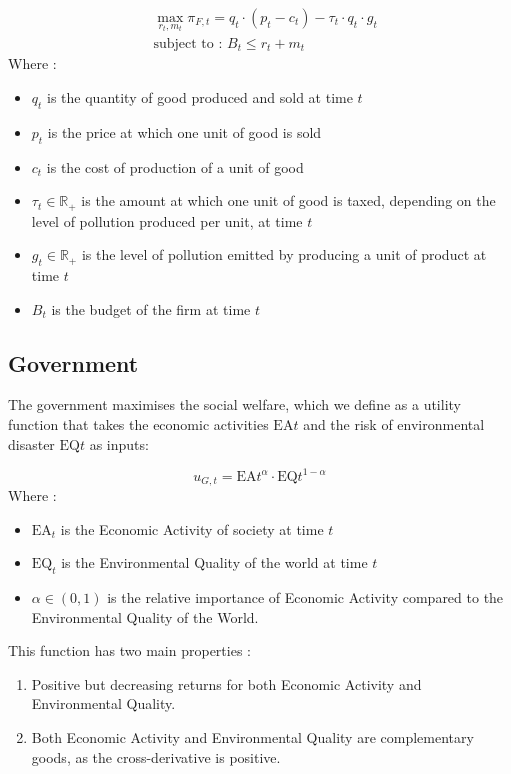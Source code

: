 \documentclass{article}
\begin{document}
\begin{equation}
    \begin{split}
        &\max_{r_{t},m_{t}}{\pi_{F,t}=q_{t}\cdot\left(p_{t}-c_{t}\right)-\tau_{t}\cdot q_{t}\cdot g_{t}} \\
        &\text{subject to : } B_{t} \leq r_{t} + m_{t}
    \end{split}
\end{equation}
Where : 
\begin{itemize}
    \item $q_{t}$ is the quantity of good produced and sold at time $t$
    \item $p_{t}$ is the price at which one unit of good is sold
    \item $c_{t}$ is the cost of production of a unit of good
    \item $\tau_{t}\in\mathbb{R}_{+}$ is the amount at which one unit of good is taxed, depending on the level of pollution produced per unit, at time $t$
    \item $g_{t}\in\mathbb{R}_{+}$ is the level of pollution emitted by producing a unit of product at time $t$
    \item $B_{t}$ is the budget of the firm at time $t$
\end{itemize}

\subsection{Government}
The government maximises the social welfare, which we define as a utility function that takes the  economic activities $\text{EA}{t}$ and the risk of environmental disaster $\text{EQ}{t}$ as inputs: 

\begin{equation}
    u_{G,t}=\text{EA}{t}^{\alpha}\cdot\text{EQ}{t}^{1-\alpha}
\end{equation}
Where : 
\begin{itemize}
    \item $\text{EA}_{t}$ is the Economic Activity of society at time $t$
    \item $\text{EQ}_{t}$ is the Environmental Quality of the world at time $t$
    \item $\alpha \in \left(0,1\right)$ is the relative importance of Economic Activity compared to the Environmental Quality of the World.
\end{itemize}
This function has two main properties : 

\begin{enumerate}
    \item Positive but decreasing returns for both Economic Activity and Environmental Quality\footnotemark[1].
    \item Both Economic Activity and Environmental Quality are complementary goods, as the cross-derivative is positive\footnotemark[2].
\end{enumerate}
\end{document}

